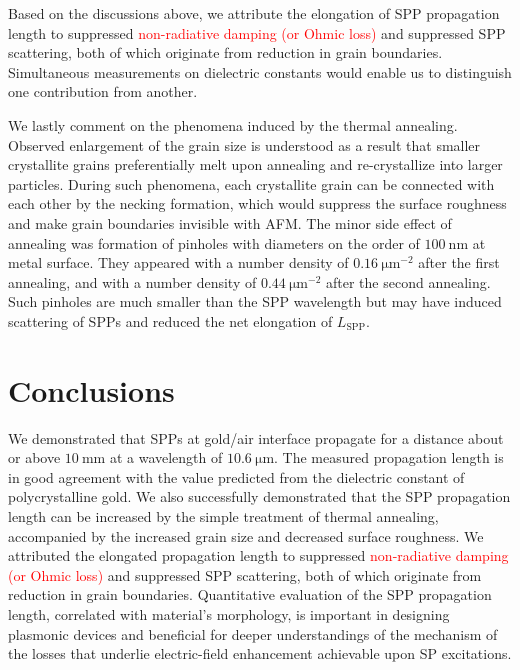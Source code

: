 \documentclass[aip,apl,reprint]{revtex4-1}
\begin{document}
Based on the discussions above, we attribute the elongation of SPP propagation length to suppressed \textcolor{red}{non-radiative damping (or Ohmic loss)} and suppressed SPP scattering, both of which originate from reduction in grain boundaries. Simultaneous measurements on dielectric constants would enable us to distinguish one contribution from another.

We lastly comment on the phenomena induced by the thermal annealing.
Observed enlargement of the grain size is understood as a result that smaller crystallite grains preferentially melt upon annealing\cite{Buffat} and re-crystallize into larger particles. 
During such phenomena, each crystallite grain can be connected with each other by the necking formation, which would suppress the surface roughness and make grain boundaries invisible with AFM. The minor side effect of annealing was formation of pinholes with diameters on the order of $100\:\mathrm{nm}$ at metal surface. They appeared with a number density of $0.16\:\mathrm{\mu m}^{-2}$ after the first annealing, and with a number density of $0.44\:\mathrm{\mu m}^{-2}$ after the second annealing. Such pinholes are much smaller than the SPP wavelength but may have induced scattering of SPPs and reduced the net elongation of $L_{\mathrm{SPP}}$.
	
\section{Conclusions}
\label{sec:conclusion}
We demonstrated that SPPs at gold/air interface propagate for a distance about or above $10\:\mathrm{mm}$ at a wavelength of $10.6\:\mathrm{\mu m}$. The measured propagation length is in good agreement with the value predicted from the dielectric constant of polycrystalline gold. We also successfully demonstrated that the SPP propagation length can be increased by the simple treatment of thermal annealing, accompanied by the increased grain size and decreased surface roughness. 
We attributed the elongated propagation length to suppressed \textcolor{red}{non-radiative damping (or Ohmic loss)} and suppressed SPP scattering, both of which originate from reduction in grain boundaries. 
Quantitative evaluation of the SPP propagation length, correlated with material's morphology, is important in designing plasmonic devices and beneficial for deeper understandings of the mechanism of the losses that underlie electric-field enhancement achievable upon SP excitations.
\end{document}
